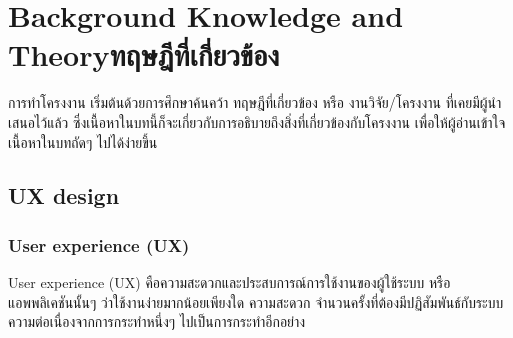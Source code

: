 \chapter{\ifenglish Background Knowledge and Theory\else ทฤษฎีที่เกี่ยวข้อง\fi}

การทำโครงงาน เริ่มต้นด้วยการศึกษาค้นคว้า ทฤษฎีที่เกี่ยวข้อง หรือ งานวิจัย/โครงงาน 
ที่เคยมีผู้นำเสนอไว้แล้ว ซึ่งเนื้อหาในบทนี้ก็จะเกี่ยวกับการอธิบายถึงสิ่งที่เกี่ยวข้องกับโครงงาน 
เพื่อให้ผู้อ่านเข้าใจเนื้อหาในบทถัดๆ ไปได้ง่ายขึ้น

\section{UX design}
\subsection{User experience (UX)}
User experience (UX) คือความสะดวกและประสบการณ์การใช้งานของผู้ใช้ระบบ 
หรือแอพพลิเคชันนั้นๆ ว่าใช้งานง่ายมากน้อยเพียงใด ความสะดวก จำนวนครั้งที่ต้องมีปฏิสัมพันธ์กับระบบ
ความต่อเนื่องจากการกระทำหนึ่งๆ ไปเป็นการกระทำอีกอย่าง

